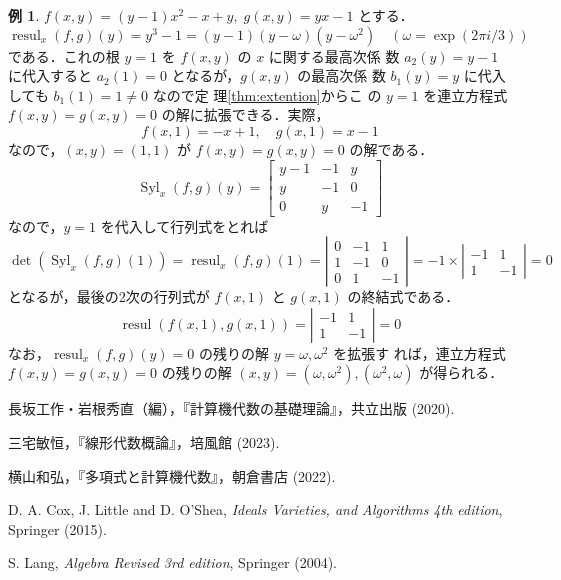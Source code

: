 \documentclass[12pt, uplatex, dvipdfmx]{jsarticle}
\theoremstyle{definition}
\newtheorem{example}{例}
\DeclareMathOperator{\Syl}{Syl}
\DeclareMathOperator{\resul}{resul}
\begin{document}
\begin{example}
  $f(x,y) = (y-1)x^2 - x +y, \; g(x,y)=yx-1$ とする．
  \[
    \resul_x(f,g)(y) = y^3-1 = (y-1)(y-\omega)(y-\omega^2) \quad \left( \omega = \exp\left(2\pi i/3\right) \right)
  \]
  である．これの根 $y=1$ を $f(x,y)$ の $x$ に関する最高次係
  数 $a_2(y)=y-1$ に代入すると $a_2(1)=0$ となるが，$g(x,y)$ の最高次係
  数 $b_1(y)=y$ に代入しても $b_1(1)=1\neq 0$ なので定
  理\ref{thm:extention}からこ
  の $y=1$ を連立方程式 $f(x,y)=g(x,y)=0$ の解に拡張できる．実際，
  \[
    f(x,1) = -x+1, \quad g(x,1)=x-1
  \]
  なので，$(x,y)=(1,1)$ が $f(x,y)=g(x,y)=0$ の解である．
  \[
    \Syl_x(f,g)(y) = \left[
      \begin{array}{ccc}
        y-1 & -1 & y\\
        y & -1 & 0\\
        0 & y & -1
      \end{array}
    \right]
  \]
  なので，$y=1$ を代入して行列式をとれば
  \[
    \det\left( \Syl_x(f,g)(1)\right) = \resul_x(f,g)(1)= \left|
      \begin{array}{rrr}
        0 & -1 & 1\\
        1 & -1 & 0\\
        0 & 1 & -1
      \end{array}
    \right| = -1 \times \left|
      \begin{array}{rr}
        -1 & 1\\
        1 & -1
      \end{array}
    \right|=0
  \]
  となるが，最後の2次の行列式が $f(x,1)$ と $g(x,1)$ の終結式である．
  \[
    \resul(f(x,1), g(x,1)) = \left|
      \begin{array}{rr}
        -1 & 1\\
        1 & -1
      \end{array}
    \right|=0
  \]
  なお，$\resul_x(f,g)(y)=0$ の残りの解 $y= \omega , \omega^2$ を拡張す
  れば，連立方程式 $f(x,y)=g(x,y)=0$ の残りの解
  $(x,y) = \left( \omega, \omega^2\right), \left( \omega^2,
    \omega\right)$ が得られる．
\end{example}

\begin{thebibliography}{99}
 長坂工作・岩根秀直（編），『計算機代数の基礎理論』，共立出版 (2020).

 三宅敏恒，『線形代数概論』，培風館 (2023).

 横山和弘，『多項式と計算機代数』，朝倉書店 (2022).

 D. A. Cox, J. Little and D. O'Shea, \textit{Ideals Varieties, and Algorithms 4th edition}, Springer (2015).

 S. Lang, \textit{Algebra Revised 3rd edition}, Springer (2004). 
\end{thebibliography}
\end{document}
